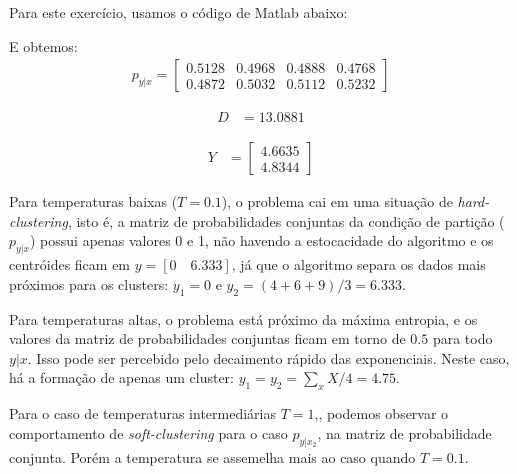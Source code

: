 \documentclass[12pt]{article}
\newenvironment{exercise}[2][Exercício]{\begin{trivlist}
\item[\hskip \labelsep {\bfseries #1}\hskip \labelsep {\bfseries #2.}]}{\end{trivlist}}
\begin{document}
\begin{exercise}{1.f}
Para este exercício, usamos o código de Matlab abaixo:


E obtemos:
\begin{align*}
p_{y|x} = \begin{bmatrix}
0.5128 & 0.4968 & 0.4888 & 0.4768\\
0.4872 & 0.5032 & 0.5112 & 0.5232
\end{bmatrix}
\end{align*}

\begin{align*}
D &= 13.0881
\end{align*}

\begin{align*}
Y &= \begin{bmatrix}
4.6635 \\ 4.8344
\end{bmatrix}
\end{align*}
\end{exercise}

\begin{exercise}{1.g}
Para temperaturas baixas ($T=0.1$), o problema cai em uma situação de
\textit{hard-clustering}, isto é, a matriz de probabilidades conjuntas
da condição de partição ($p_{y|x}$) possui apenas valores 0 e 1, não havendo a
estocacidade do algoritmo e os centróides ficam em $y = [0
\quad 6.333]$, já que o algoritmo separa os dados mais próximos para os
clusters: $y_1 = 0$ e $y_2 = (4 + 6 + 9)/3 = 6.333$.

Para temperaturas altas, o problema está
próximo da máxima entropia, e os valores da matriz de probabilidades conjuntas
ficam em torno de $0.5$ para todo $y|x$. Isso pode ser percebido pelo decaimento
rápido das exponenciais. Neste caso, há a formação de apenas um cluster: $y_1 =
y_2 = \sum_x X / 4 = 4.75$.

Para o caso de temperaturas intermediárias $T = 1$,, podemos observar o
comportamento de \textit{soft-clustering} para o caso $p_{y|x_2}$, na matriz de
probabilidade conjunta. Porém a temperatura se assemelha mais ao caso quando
$T=0.1$.

\end{exercise}
\end{document}
